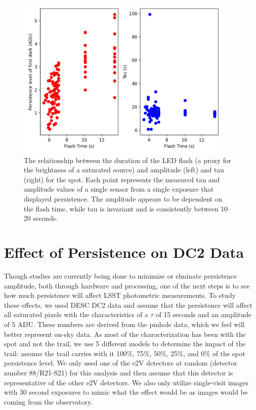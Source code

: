 \documentclass[DM,authoryear,toc]{lsstdoc}
\begin{document}
\begin{figure}[!ht]
  \centering
  \includegraphics[width=0.95\textwidth, angle=0]{Persistence_Flash_Tau.png}
  \caption{
  The relationship between the duration of the LED flash (a proxy for the brightness of a saturated source) and amplitude (left) and tau (right) for the spot.
  Each point represents the measured tau and amplitude values of a single sensor from a single exposure that displayed persistence.
  The amplitude appears to be dependent on the flash time, while tau is invariant and is consistently between 10--20 seconds. 
  }\label{fig:Pers_Flash_Tau}
\end{figure}

\section{Effect of Persistence on DC2 Data}

Though studies are currently being done to minimize or elminate persistence amplitude, both through hardware and processing, one of the next steps is to see how much persistence will affect LSST photometric measurements.
To study these effects, we used DESC DC2 data and assume that the persistence will affect all saturated pixels with the characteristics of a \textit{$\tau$} of 15 seconds and an amplitude of 5 ADU\@.
These numbers are derived from the pinhole data, which we feel will better represent on-sky data.
As most of the characterization has been with the spot and not the trail, we use 5 different models to determine the impact of the trail: assume the trail carries with it 100\%, 75\%, 50\%, 25\%, and 0\% of the spot persistence level.
We only used one of the e2V detectors at random (detector number 88/R21-S21) for this analysis and then assume that this detector is representative of the other e2V detectors.
We also only utilize single-visit images with 30 second exposures to mimic what the effect would be as images would be coming from the observatory.
\end{document}
